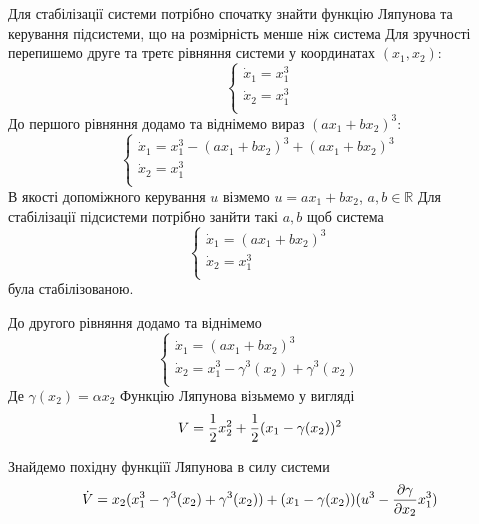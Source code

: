 \documentclass{article}
\begin{document}
Для стабілізації системи потрібно спочатку знайти функцію Ляпунова
та керування підсистеми, що на розмірність менше ніж система 
Для зручності перепишемо друге та третє рівняння системи
у координатах $(x_1,x_2)$:
\begin{equation}
    \begin{cases}
    \dot x_1 = x_1^3\\
    \dot x_2 = x_{1}^3\\
    \end{cases}
\end{equation}
До першого рівняння додамо та віднімемо вираз $(ax_1+bx_2)^3$:
\begin{equation}
    \begin{cases}
    \dot x_1 = x_1^3 - (ax_1+bx_2)^3 +(ax_1+bx_2)^3 \\
    \dot x_2 = x_{1}^3\\
    \end{cases}
\end{equation}
В якості допоміжного керування $u$ візмемо $u=ax_1+bx_2$, $a,b \in \mathbb{R}$
Для стабілізації підсистеми потрібно занйти такі  $a,b$ щоб система 
\begin{equation}
    \begin{cases}
    \dot x_1 = (ax_1+bx_2)^3\\
    \dot x_2 = x_{1}^3\\
    \end{cases}
\end{equation}
була стабілізованою.

До другого рівняння додамо та віднімемо 
\begin{equation}
    \begin{cases}
    \dot x_1 = (ax_1+bx_2)^3\\
    \dot x_2 = x_{1}^3 -\gamma^3(x_2)+\gamma^3(x_2)\\
    \end{cases}
\end{equation}
Де $\gamma(x_2) = \alpha x_2$
Функцію Ляпунова візьмемо у вигляді  
\begin{equation}
    V = \frac{1}{2}x_{2}^2 +\frac{1}{2}(x_1 - \gamma(x_2) )^2\\
\end{equation}

Знайдемо похідну функціїї Ляпунова в силу системи 
\begin{equation}
    \dot V = x_2(x_1^3 - \gamma^3(x_2)+\gamma^3(x_2)) + \\
    (x_1 - \gamma(x_2))(u^3-\frac{\partial \gamma}{\partial x_2}x_1^3)
\end{equation}
\end{document}
